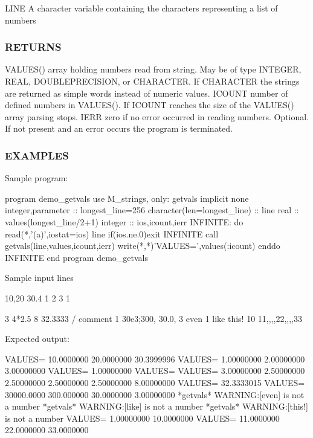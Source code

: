 L\+I\+NE A character variable containing the characters representing a list of numbers

\subsubsection*{R\+E\+T\+U\+R\+NS}

V\+A\+L\+U\+E\+S() array holding numbers read from string. May be of type I\+N\+T\+E\+G\+ER, R\+E\+AL, D\+O\+U\+B\+L\+E\+P\+R\+E\+C\+I\+S\+I\+ON, or C\+H\+A\+R\+A\+C\+T\+ER. If C\+H\+A\+R\+A\+C\+T\+ER the strings are returned as simple words instead of numeric values. I\+C\+O\+U\+NT number of defined numbers in V\+A\+L\+U\+E\+S(). If I\+C\+O\+U\+NT reaches the size of the V\+A\+L\+U\+E\+S() array parsing stops. I\+E\+RR zero if no error occurred in reading numbers. Optional. If not present and an error occurs the program is terminated.

\subsubsection*{E\+X\+A\+M\+P\+L\+ES}

Sample program\+: \begin{DoxyVerb}program demo_getvals
use M_strings, only: getvals
implicit none
integer,parameter  :: longest_line=256
character(len=longest_line) :: line
real               :: values(longest_line/2+1)
integer            :: ios,icount,ierr
INFINITE: do
   read(*,'(a)',iostat=ios) line
   if(ios.ne.0)exit INFINITE
   call getvals(line,values,icount,ierr)
   write(*,*)'VALUES=',values(:icount)
enddo INFINITE
end program demo_getvals
\end{DoxyVerb}


Sample input lines \begin{DoxyVerb} 10,20 30.4
 1 2 3
 1

 3 4*2.5 8
 32.3333 / comment 1
 30e3;300,    30.0, 3
 even 1 like this! 10
 11,,,,22,,,,33
\end{DoxyVerb}


Expected output\+: \begin{DoxyVerb}VALUES=   10.0000000       20.0000000       30.3999996
VALUES=   1.00000000       2.00000000       3.00000000
VALUES=   1.00000000
VALUES=
VALUES=   3.00000000       2.50000000       2.50000000       2.50000000       2.50000000       8.00000000
VALUES=   32.3333015
VALUES=   30000.0000       300.000000       30.0000000       3.00000000
*getvals* WARNING:[even] is not a number
*getvals* WARNING:[like] is not a number
*getvals* WARNING:[this!] is not a number
VALUES=   1.00000000       10.0000000
VALUES=   11.0000000       22.0000000       33.0000000
\end{DoxyVerb}


